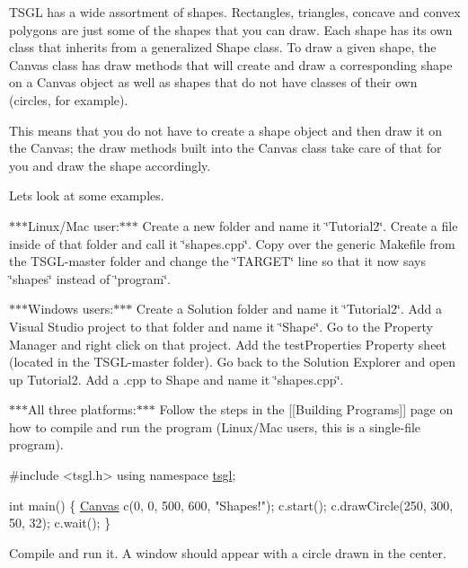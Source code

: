 T\+S\+G\+L has a wide assortment of shapes. Rectangles, triangles, concave and convex polygons are just some of the shapes that you can draw. Each shape has its own class that inherits from a generalized Shape class. To draw a given shape, the Canvas class has draw methods that will create and draw a corresponding shape on a Canvas object as well as shapes that do not have classes of their own (circles, for example).

This means that you do not have to create a shape object and then draw it on the Canvas; the draw methods built into the Canvas class take care of that for you and draw the shape accordingly.

Let\textquotesingle{}s look at some examples.

$\ast$$\ast$$\ast$\+Linux/\+Mac user\+:$\ast$$\ast$$\ast$ Create a new folder and name it \char`\"{}\+Tutorial2\char`\"{}. Create a file inside of that folder and call it \char`\"{}shapes.\+cpp\char`\"{}. Copy over the generic Makefile from the T\+S\+G\+L-\/master folder and change the \char`\"{}\+T\+A\+R\+G\+E\+T\char`\"{} line so that it now says \char`\"{}shapes\char`\"{} instead of \char`\"{}program\char`\"{}.

$\ast$$\ast$$\ast$\+Windows users\+:$\ast$$\ast$$\ast$ Create a Solution folder and name it \char`\"{}\+Tutorial2\char`\"{}. Add a Visual Studio project to that folder and name it \char`\"{}\+Shape\char`\"{}. Go to the Property Manager and right click on that project. Add the test\+Properties Property sheet (located in the T\+S\+G\+L-\/master folder). Go back to the Solution Explorer and open up Tutorial2. Add a .cpp to Shape and name it \char`\"{}shapes.\+cpp\char`\"{}.

$\ast$$\ast$$\ast$\+All three platforms\+:$\ast$$\ast$$\ast$ Follow the steps in the \mbox{[}\mbox{[}Building Programs\mbox{]}\mbox{]} page on how to compile and run the program (Linux/\+Mac users, this is a single-\/file program).


\begin{DoxyCode}
\textcolor{preprocessor}{#include <tsgl.h>}
\textcolor{keyword}{using namespace }\hyperlink{namespacetsgl}{tsgl};

\textcolor{keywordtype}{int} main() \{
  \hyperlink{classtsgl_1_1_canvas}{Canvas} c(0, 0, 500, 600, \textcolor{stringliteral}{"Shapes!"});
  c.start();
  c.drawCircle(250, 300, 50, 32);
  c.wait();
\}
\end{DoxyCode}


Compile and run it. A window should appear with a circle drawn in the center.

